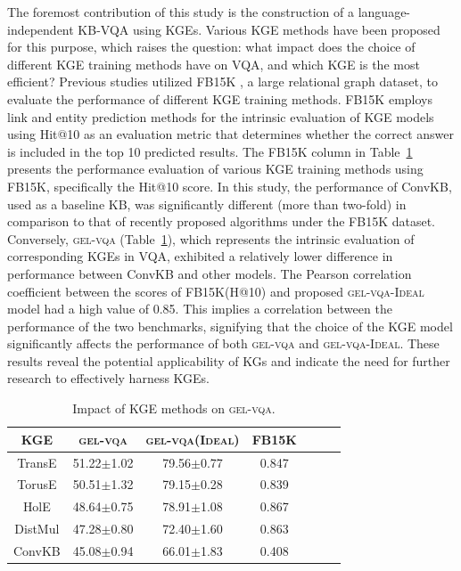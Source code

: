 \documentclass[letterpaper]{article} %
\begin{document}
The foremost contribution of this study is the construction of a language-independent KB-VQA using KGEs. Various KGE methods have been proposed for this purpose, which raises the question: what impact does the choice of different KGE training methods have on VQA, and which KGE is the most efficient? Previous studies utilized FB15K \cite{rossi2021knowledge}, a large relational graph dataset, to evaluate the performance of different KGE training methods. FB15K employs link and entity prediction methods for the intrinsic evaluation of KGE models using Hit@10 as an evaluation metric that determines whether the correct answer is included in the top 10 predicted results. The FB15K column in Table~\ref{tab:table6} presents the performance evaluation of various KGE training methods using FB15K, specifically the Hit@10 score. In this study, the performance of ConvKB, used as a baseline KB, was significantly different (more than two-fold) in comparison to that of recently proposed algorithms under the FB15K dataset. Conversely, \textsc{gel-vqa} (Table~\ref{tab:table6}), which represents the intrinsic evaluation of corresponding KGEs in VQA, exhibited a relatively lower difference in performance between ConvKB and other models. The Pearson correlation coefficient between the scores of FB15K(H@10) and proposed \textsc{gel-vqa-Ideal} model had a high value of 0.85. This implies a correlation between the performance of the two benchmarks, signifying that the choice of the KGE model significantly affects the performance of both \textsc{gel-vqa} and \textsc{gel-vqa-Ideal}. These results reveal the potential applicability of KGs and indicate the need for further research to effectively harness KGEs.
\begin{table}[t!]
\centering
\small
\begin{adjustbox}{width=0.45\columnwidth}
\begin{tabular}{ccccccc}
\toprule
KGE   & \textsc{gel-vqa}           & \textsc{gel-vqa(Ideal)}         & FB15K %
\\
\midrule
TransE       &51.22$\pm$1.02              &79.56$\pm$0.77                      & 0.847                \\
TorusE       &50.51$\pm$1.32              &79.15$\pm$0.28                      & 0.839                \\
HolE         &48.64$\pm$0.75              &78.91$\pm$1.08                      & 0.867                \\
DistMul      &47.28$\pm$0.80              &72.40$\pm$1.60                      & 0.863                \\
ConvKB       &45.08$\pm$0.94              &66.01$\pm$1.83                      & 0.408                \\

\bottomrule
\end{tabular}
\end{adjustbox}
\caption{Impact of KGE methods on \textsc{gel-vqa}.}
\label{tab:table6}
\end{table}
\end{document}

